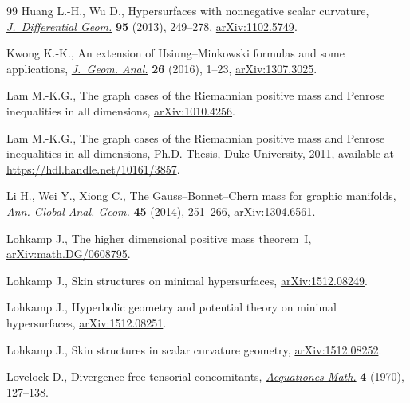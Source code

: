 \documentclass[pdftex]{sigma}
\numberwithin{equation}{section}
\begin{document}
\begin{thebibliography}{99}
Huang L.-H., Wu D., Hypersurfaces with nonnegative scalar curvature,
 \href{https://doi.org/10.4310/jdg/1376053447}{\textit{J.~Differential Geom.}} \textbf{95} (2013), 249--278,
 \href{https://arxiv.org/abs/1102.5749}{arXiv:1102.5749}.

Kwong K.-K., An extension of {H}siung--{M}inkowski formulas and some
 applications, \href{https://doi.org/10.1007/s12220-014-9536-8}{\textit{J.~Geom. Anal.}} \textbf{26} (2016), 1--23,
 \href{https://arxiv.org/abs/1307.3025}{arXiv:1307.3025}.

Lam M.-K.G., The graph cases of the {R}iemannian positive mass and {P}enrose
 inequalities in all dimensions, \href{https://arxiv.org/abs/1010.4256}{arXiv:1010.4256}.

Lam M.-K.G., The graph cases of the {R}iemannian positive mass and {P}enrose
 inequalities in all dimensions, Ph.D. Thesis, {D}uke University, 2011,
 available at
 \url{https://hdl.handle.net/10161/3857}.

Li H., Wei Y., Xiong C., The {G}auss--{B}onnet--{C}hern mass for graphic
 manifolds, \href{https://doi.org/10.1007/s10455-013-9399-4}{\textit{Ann. Global Anal. Geom.}} \textbf{45} (2014), 251--266,
 \href{https://arxiv.org/abs/1304.6561}{arXiv:1304.6561}.

Lohkamp J., The higher dimensional positive mass theorem~{I},
 \href{https://arxiv.org/abs/math.DG/0608795}{arXiv:math.DG/0608795}.

Lohkamp J., Skin structures on minimal hypersurfaces, \href{https://arxiv.org/abs/1512.08249}{arXiv:1512.08249}.

Lohkamp J., Hyperbolic geometry and potential theory on minimal hypersurfaces,
 \href{https://arxiv.org/abs/1512.08251}{arXiv:1512.08251}.

Lohkamp J., Skin structures in scalar curvature geometry, \href{https://arxiv.org/abs/1512.08252}{arXiv:1512.08252}.

Lovelock D., Divergence-free tensorial concomitants, \href{https://doi.org/10.1007/BF01817753}{\textit{Aequationes Math.}}
 \textbf{4} (1970), 127--138.


\end{thebibliography}
\end{document}
